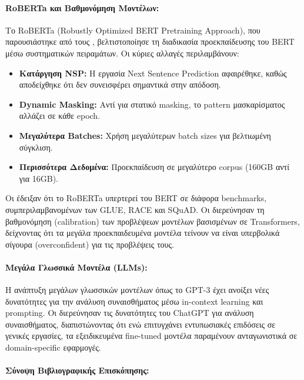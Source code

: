 \documentclass[a4paper,11pt,oneside,openany]{ioniothesis}
\begin{document}
\paragraph{RoBERTa και Βαθμονόμηση Μοντέλων:}

Το RoBERTa (Robustly Optimized BERT Pretraining Approach), που παρουσιάστηκε από τους \cite{liu2019roberta}, βελτιστοποίησε τη διαδικασία προεκπαίδευσης του BERT μέσω συστηματικών πειραμάτων. Οι κύριες αλλαγές περιλαμβάνουν:

\begin{itemize}
    \item \textbf{Κατάργηση NSP:} Η εργασία Next Sentence Prediction αφαιρέθηκε, καθώς αποδείχθηκε ότι δεν συνεισφέρει σημαντικά στην απόδοση.
    \item \textbf{Dynamic Masking:} Αντί για στατικό masking, το pattern μασκαρίσματος αλλάζει σε κάθε epoch.
    \item \textbf{Μεγαλύτερα Batches:} Χρήση μεγαλύτερων batch sizes για βελτιωμένη σύγκλιση.
    \item \textbf{Περισσότερα Δεδομένα:} Προεκπαίδευση σε μεγαλύτερο corpus (160GB αντί για 16GB).
\end{itemize}

Οι \cite{liu2019roberta} έδειξαν ότι το RoBERTa υπερτερεί του BERT σε διάφορα benchmarks, συμπεριλαμβανομένων των GLUE, RACE και SQuAD. Οι \cite{desai2020calibration} διερεύνησαν τη βαθμονόμηση (calibration) των προβλέψεων μοντέλων βασισμένων σε Transformers, δείχνοντας ότι τα μεγάλα προεκπαιδευμένα μοντέλα τείνουν να είναι υπερβολικά σίγουρα (overconfident) για τις προβλέψεις τους.

\paragraph{Μεγάλα Γλωσσικά Μοντέλα (LLMs):}

Η ανάπτυξη μεγάλων γλωσσικών μοντέλων όπως το GPT-3 \cite{brown2020language} έχει ανοίξει νέες δυνατότητες για την ανάλυση συναισθήματος μέσω in-context learning και prompting. Οι \cite{zhang2023sentiment} διερεύνησαν τις δυνατότητες του ChatGPT για ανάλυση συναισθήματος, διαπιστώνοντας ότι ενώ επιτυγχάνει εντυπωσιακές επιδόσεις σε γενικές εργασίες, τα εξειδικευμένα fine-tuned μοντέλα παραμένουν ανταγωνιστικά σε domain-specific εφαρμογές.

\paragraph{Σύνοψη Βιβλιογραφικής Επισκόπησης:}
\end{document}
